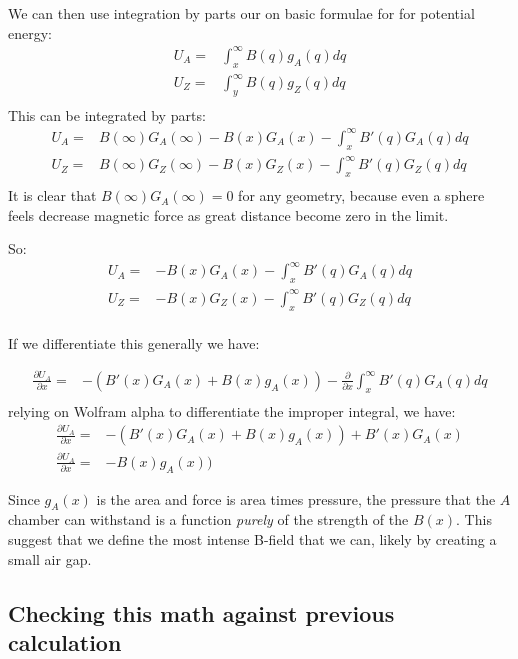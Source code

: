 \documentclass{asme2ej}
\begin{document}
We can then use integration by parts our on basic formulae for
for potential energy:
\begin{align}
  U_A = &\int_x^\infty B(q) g_A(q) dq \\
  U_Z = & \int_y^\infty B(q) g_Z(q) dq \\
\end{align}
This can be integrated by parts:
\begin{align}
  U_A = & B(\infty) G_A(\infty) - B(x) G_A(x) - \int_x^\infty B'(q) G_A(q) dq \\
  U_Z = & B(\infty) G_Z(\infty) - B(x) G_Z(x) - \int_x^\infty B'(q) G_Z(q) dq \\
\end{align}
It is clear that $B(\infty) G_A(\infty) = 0$ for any geometry, because even a
sphere feels decrease magnetic force as great distance become zero in the limit.

So:
\begin{align}
  U_A = & - B(x) G_A(x) - \int_x^\infty B'(q) G_A(q) dq \\
  U_Z = & - B(x) G_Z(x) - \int_x^\infty B'(q) G_Z(q) dq \\
\end{align}

If we differentiate this generally we have:

\begin{align}
  \frac{\partial U_A}{\partial x}= & - (B'(x) G_A(x) + B(x) g_A(x ))  -  \frac{\partial }{\partial x}\int_x^\infty B'(q) G_A(q) dq \\
\end{align}
relying on Wolfram alpha to differentiate the improper integral, we have:
\begin{align}
  \frac{\partial U_A}{\partial x}= & - (B'(x) G_A(x) + B(x) g_A(x ))  +  B'(x) G_A(x) \\
  \frac{\partial U_A}{\partial x}= &  - B(x) g_A(x ))
\end{align}

Since $g_A(x)$ is the area and force is area times pressure, the pressure that the $A$ chamber
can withstand is a function {\em purely} of the strength of the $B(x)$. This suggest that we
define the most intense B-field that we can, likely by creating a small air gap.

\subsection{Checking this math against previous calculation}
\end{document}
